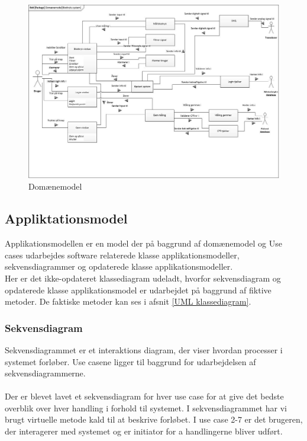 \begin{figure}[H]
	\centering
	\includegraphics[width=1\textwidth]{Figurer/ISE/Domaenemodel}
	\caption{Domænemodel}
	\label{domaenemodel}
\end{figure}

\subsection{Appliktationsmodel}
Applikationsmodellen er en model der på baggrund af domænemodel og Use cases udarbejdes software relaterede klasse applikationsmodeller, sekvensdiagrammer og opdaterede klasse applikationsmodeller.\\
Her er det ikke-opdateret klassediagram udeladt, hvorfor sekvensdiagram og opdaterede  klasse applikationsmodel er udarbejdet på baggrund af fiktive metoder. De faktiske metoder kan ses i afsnit \ref{UML klassediagram}.

\subsubsection{Sekvensdiagram}
Sekvensdiagrammet er et interaktions diagram, der viser hvordan processer i systemet forløber. Use casene ligger til baggrund for udarbejdelsen af sekvensdiagrammerne.\\ \\
Der er blevet lavet et sekvensdiagram for hver use case for at give det bedste overblik over hver handling i forhold til systemet. I sekvensdiagrammet har vi brugt virtuelle metode kald til at beskrive forløbet. I use case 2-7 er det brugeren, der interagerer med systemet og er initiator for a handlingerne bliver udført.

